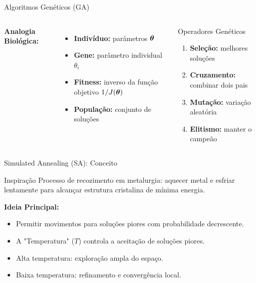 \begin{frame}{Algoritmos Genéticos (GA)}

\begin{columns}
\textbf{Analogia Biológica:}
\begin{itemize}\small
    \item \textbf{Indivíduo:} parâmetros $\boldsymbol{\theta}$
    \item \textbf{Gene:} parâmetro individual $\theta_i$
    \item \textbf{Fitness:} inverso da função objetivo $1/J(\boldsymbol{\theta})$
    \item \textbf{População:} conjunto de soluções
\end{itemize}

\begin{block}{Operadores Genéticos}\small
\begin{enumerate}
    \item \textbf{Seleção:} melhores soluções
    \item \textbf{Cruzamento:} combinar dois pais
    \item \textbf{Mutação:} variação aleatória
    \item \textbf{Elitismo:} manter o campeão
\end{enumerate}
\end{block}
\end{columns}
\end{frame}

\begin{frame}{Simulated Annealing (SA): Conceito}
\begin{block}{Inspiração}
Processo de recozimento em metalurgia: aquecer metal e esfriar lentamente para alcançar estrutura cristalina de mínima energia.
\end{block}

\textbf{Ideia Principal:}
\begin{itemize}
    \item Permitir movimentos para soluções piores com probabilidade decrescente.
    \item A "Temperatura" ($T$) controla a aceitação de soluções piores.
    \item Alta temperatura: exploração ampla do espaço.
    \item Baixa temperatura: refinamento e convergência local.
\end{itemize}
\end{frame}

